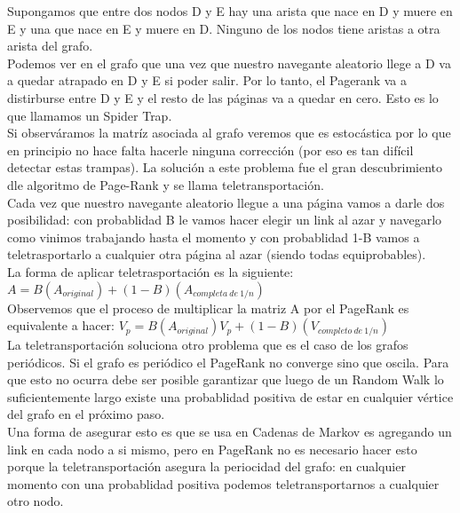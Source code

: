 \documentclass[titlepage,a4paper]{article}
\begin{document}
Supongamos que entre dos nodos D y E hay una arista que nace en D y muere en E y una que nace en E y muere en D. Ninguno de los nodos tiene aristas a otra arista del grafo. \\


Podemos ver en el grafo que una vez que nuestro navegante aleatorio llege a D va a quedar atrapado en D y E si poder salir. Por lo tanto, el Pagerank va a distirburse entre D y E y el resto de las  páginas va a quedar en cero. Esto es lo que llamamos un Spider Trap. \\

Si observáramos la matríz asociada al grafo veremos que es estocástica por lo que en principio no hace falta hacerle ninguna corrección (por eso es tan difícil detectar estas trampas). La solución a este problema fue el gran descubrimiento dle algoritmo de Page-Rank y se llama teletransportación. \\

Cada vez que nuestro navegante aleatorio llegue a una página vamos a darle dos posibilidad: con probablidad B le vamos hacer elegir un link al azar y navegarlo como vinimos trabajando hasta el momento y con probablidad 1-B vamos a teletrasportarlo a cualquier otra página al azar (siendo todas equiprobables). \\

La forma de aplicar teletrasportación es la siguiente: $A = B (A_{original}) + (1-B)(A_{completa\ de\ 1/n})$\\

Observemos que el proceso de multiplicar la matriz A por el PageRank es equivalente a hacer: $V_p = B (A_{original}) V_p + (1-B)(V_{completo\ de\ 1/n})$\\

La teletransportación soluciona otro problema que es el caso de los grafos periódicos. Si el grafo es periódico el PageRank no converge sino que oscila. Para que esto no ocurra debe ser posible garantizar que luego de un Random Walk lo suficientemente largo existe una probablidad positiva de estar en cualquier vértice del grafo en el próximo paso. \\

Una forma de asegurar esto es que se usa en Cadenas de Markov es agregando un link en cada nodo a si mismo, pero en PageRank no es necesario hacer esto porque la teletransportación asegura la periocidad del grafo: en cualquier momento con una probablidad positiva podemos teletransportarnos a cualquier otro nodo. 
\end{document}
